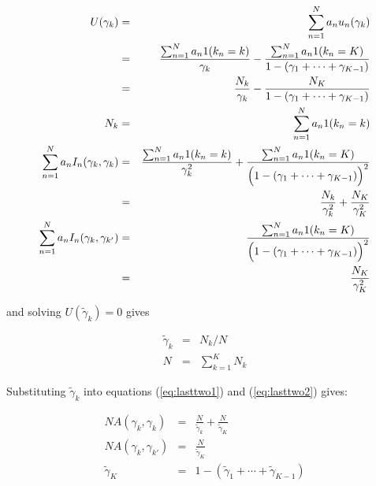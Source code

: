 \documentclass[11pt]{article}
\begin{document}
\begin{eqnarray}
U(\gamma_{k}) & = & \sum_{n=1}^N a_n u_n(\gamma_{k})  \\
                       & = & \frac{\sum_{n=1}^N a_n 1(k_n=k)}{\gamma_k} - 
                                  \frac{\sum_{n=1}^N a_n
                                    1(k_n=K)}{1-(\gamma_1 + 
                                     \cdots +\gamma_{K-1})} \\
                        & = & \frac{N_k}{\gamma_k} - 
                                   \frac{N_K}{1-(\gamma_1 + \cdots +\gamma_{K-1})} \\
N_k & = &\sum_{n=1}^N a_n 1(k_n=k) \\
\sum_{n=1}^N a_n I_n(\gamma_k,\gamma_k)  & = & 
                          \frac{ \sum_{n=1}^N a_n 1(k_n=k)}{\gamma_k^2} +
                          \frac{ \sum_{n=1}^N a_n 1(k_n=K)}{\Bigl(1-(\gamma_1 + \cdots
                          +\gamma_{K-1})\Bigr)^2} \\
         & = & \frac{N_k}{\gamma_k^2} + 
                            \frac{
                              N_K}{\gamma_K^2}   \label{eq:lasttwo1} \\  
\sum_{n=1}^N a_n I_n(\gamma_k,\gamma_{k'}) & = & 
                          \frac{ \sum_{n=1}^N a_n 1(k_n=K)}
                          {\Bigl(1-(\gamma_1 + \cdots
                            +\gamma_{K-1})\Bigr)^2} \\
           & = & \frac{ N_K} {\gamma_K^2} \label{eq:lasttwo2}
\end{eqnarray}

and solving $U(\tilde{\gamma}_{k})=0$ gives 

\begin{eqnarray}
  \label{eq:3}
\tilde{\gamma}_{k} & = & N_k/N\\
N & = &\sum_{k=1}^K N_k
\end{eqnarray}


Substituting $\tilde{\gamma}_k$ into equations (\ref{eq:lasttwo1}) and 
(\ref{eq:lasttwo2}) gives:

\begin{eqnarray}
NA(\gamma_k,\gamma_k) & = & 
                                                 \frac{N}{\tilde{\gamma}_k} +
                                                 \frac{N}{\tilde{\gamma}_K}
                                                 \\
NA(\gamma_k,\gamma_{k'}) & = & \frac{N}{\tilde{\gamma}_K} \\
\tilde{\gamma}_K & = & 1-(\tilde{\gamma}_1 + \cdots + \tilde{\gamma}_{K-1})
\end{eqnarray}
\end{document}
